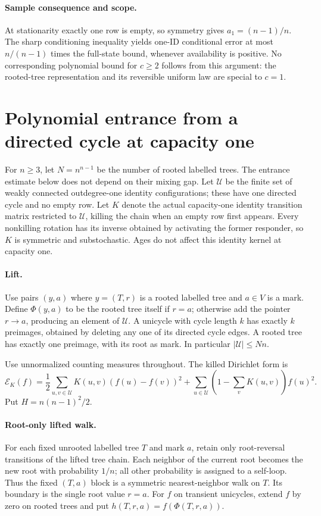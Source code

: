 \documentclass[11pt]{article}
\begin{document}
\paragraph{Sample consequence and scope.}
At stationarity exactly one row is empty, so symmetry gives
$a_1=(n-1)/n$. The sharp conditioning inequality yields one-ID
conditional error at most $n/(n-1)$ times the full-state bound,
whenever availability is positive. No corresponding polynomial
bound for $c\ge2$ follows from this argument: the rooted-tree
representation and its reversible uniform law are special to $c=1$.
\section{Polynomial entrance from a directed cycle at capacity one}
For $n\ge3$, let $N=n^{n-1}$ be the number of rooted labelled trees.
The entrance estimate below does not depend on their mixing gap. Let $\mathcal U$ be the finite
set of weakly connected outdegree-one identity configurations; these
have one directed cycle and no empty row. Let $K$ denote the actual
capacity-one identity transition matrix restricted to $\mathcal U$,
killing the chain when an empty row first appears. Every nonkilling
rotation has its inverse obtained by activating the former responder,
so $K$ is symmetric and substochastic. Ages do not affect this identity
kernel at capacity one.

\paragraph{Lift.}
Use pairs $(y,a)$ where $y=(T,r)$ is a rooted labelled tree and
$a\in V$ is a mark. Define $\Phi(y,a)$ to be the rooted tree itself
if $r=a$; otherwise add the pointer $r\to a$, producing an element
of $\mathcal U$. A unicycle with cycle length $k$ has exactly $k$
preimages, obtained by deleting any one of its directed cycle edges.
A rooted tree has exactly one preimage, with its root as mark.
In particular $|\mathcal U|\le Nn$.

Use unnormalized counting measures throughout. The killed Dirichlet form is
\[
 \mathcal E_K(f)=\frac12\sum_{u,v\in\mathcal U}
 K(u,v)(f(u)-f(v))^2
 +\sum_{u\in\mathcal U}\left(1-\sum_vK(u,v)\right)f(u)^2.
\]
Put $H=n(n-1)^2/2$.

\paragraph{Root-only lifted walk.}
For each fixed unrooted labelled tree $T$ and mark $a$, retain only
root-reversal transitions of the lifted tree chain. Each neighbor
of the current root becomes the new root with probability $1/n$;
all other probability is assigned to a self-loop. Thus the fixed
$(T,a)$ block is a symmetric nearest-neighbor walk on $T$. Its
boundary is the single root value $r=a$.
For $f$ on transient unicycles, extend $f$ by zero on rooted trees
and put $h(T,r,a)=f(\Phi(T,r,a))$.
\end{document}
